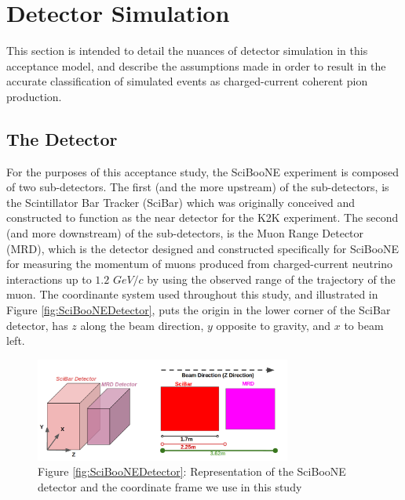 \documentclass[11pt]{article}
\begin{document}
\section{Detector Simulation}\label{sec:simulation}
This section is intended to detail the nuances of detector simulation in this acceptance model, and describe the assumptions made in order to result in the accurate classification of simulated events as charged-current coherent pion production.

\subsection{The Detector}\label{subsec:detector}
For the purposes of this acceptance study, the SciBooNE experiment is composed of two sub-detectors. The first (and the more upstream) of the sub-detectors, is the Scintillator Bar Tracker (SciBar) which was originally conceived and constructed to function as the near detector for the K2K experiment. The second (and more downstream) of the sub-detectors, is the Muon Range Detector (MRD), which is the detector designed and constructed specifically for SciBooNE for measuring the momentum of muons produced from charged-current neutrino interactions up to $1.2$ $GeV/c$ by using the observed range of the trajectory of the muon. The coordinante system used throughout this study, and illustrated in  Figure \ref*{fig:SciBooNEDetector}, puts the origin in the lower corner of the SciBar detector, has $z$ along the beam direction, $y$ opposite to gravity, and $x$ to beam left. 

\begin{figure}[H]
\centering
\includegraphics[width=0.75\textwidth]{EventClassifications/SciBooNEDetector.png}
\caption*{Figure \ref*{fig:SciBooNEDetector}: Representation of the SciBooNE detector and the coordinate frame we use in this study}
\end{figure}\label{fig:SciBooNEDetector}
\end{document}
